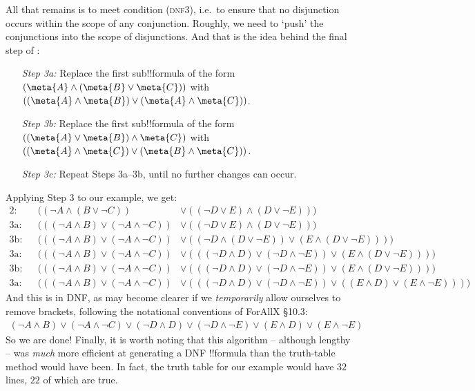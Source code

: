 \documentclass[../../../include/open-logic-section]{subfiles}
\begin{document}
All that remains is to meet condition (\textsc{dnf3}), i.e.\ to ensure that no disjunction occurs within the scope of any conjunction. Roughly, we need to `push' the conjunctions into the scope of disjunctions. And that is the idea behind the final step of \intoDNF:
	\begin{itemize}
		\item[\emph{Step 3a:}]  Replace the first sub!!{formula} of the form $(\meta{A} \land (\meta{B} \lor \meta{C}))$ with $((\meta{A} \land \meta{B}) \lor (\meta{A} \land \meta{C}))$. 		
		\item[\emph{Step 3b:}]  Replace the first sub!!{formula} of the form $((\meta{A} \lor \meta{B}) \land \meta{C})$ with $((\meta{A} \land \meta{C}) \lor (\meta{B} \land \meta{C}))$. 
	\item[\emph{Step 3c:}] Repeat Steps 3a--3b, until no further changes can occur.
	\end{itemize}
Applying Step 3 to our example, we get:
{\small	\begin{align*}
		\text{2}: & & ((\lnot A \land (B \lor \lnot  C)) &\lor  ((\lnot D \lor E) \land (D \lor  \lnot E)))\\
		\text{3a}: & & (((\lnot A \land B) \lor (\lnot A \land \lnot  C)) &\lor  ((\lnot D \lor E) \land (D \lor  \lnot E)))\\	
		\text{3b}: & & (((\lnot A \land B) \lor (\lnot A \land \lnot  C)) &\lor  ((\lnot D \land (D \lor \lnot E)) \lor (E \land (D \lor  \lnot E))))\\
		\text{3a}: & & (((\lnot A \land B) \lor (\lnot A \land \lnot  C)) &\lor  (((\lnot D \land D) \lor (\lnot D \land \lnot E)) \lor (E \land (D \lor  \lnot E))))\\
		\text{3b}: & & (((\lnot A \land B) \lor (\lnot A \land \lnot  C)) &\lor  (((\lnot D \land D) \lor (\lnot D \land \lnot E)) \lor (E \land (D \lor  \lnot E))))\\
		\text{3a}: & & (((\lnot A \land B) \lor (\lnot A \land \lnot  C)) &\lor  (((\lnot D \land D) \lor (\lnot D \land \lnot E)) \lor ((E \land D) \lor  (E \land \lnot E))))
	\end{align*}}\noindent 
And this is in DNF, as may become clearer if we \emph{temporarily} allow ourselves to remove brackets, following the notational conventions of ForAllX{} \S10.3:
		\begin{align*}
		(\lnot A \land B) \lor (\lnot A \land \lnot  C) \lor  (\lnot D \land D) \lor (\lnot D \land \lnot E) \lor (E \land D) \lor  (E \land \lnot E)
		\end{align*}
So we are done! Finally, it is worth noting that this algorithm -- although lengthy -- was \emph{much} more efficient at generating a DNF !!{formula} than the truth-table method would have been. In fact, the truth table for our example would have $32$ lines, $22$ of which are true.
\end{document}
